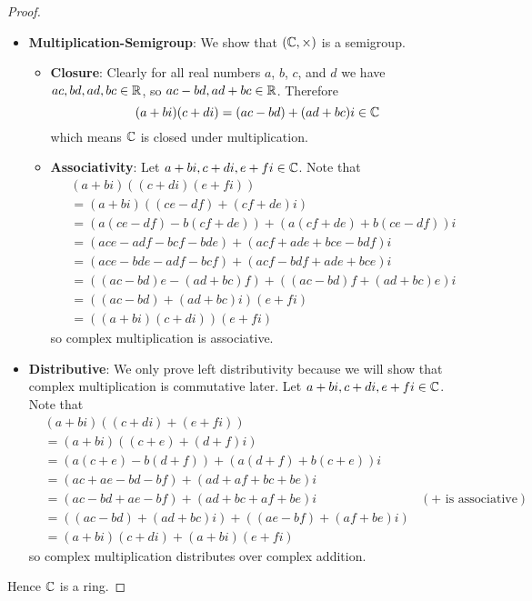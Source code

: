 \begin{proof}
\begin{itemize}
        \item \textbf{Multiplication-Semigroup}: We show that $(\mathbb{C}, \times)$ is a semigroup.
        \begin{itemize}
            \item \textbf{Closure}: Clearly for all real numbers $a$, $b$, $c$, and $d$ we have $ac, bd, ad, bc \in \mathbb{R}$, so $ac - bd, ad + bc \in \mathbb{R}$. Therefore
            \[
                (a+bi)(c+di) = (ac-bd) + (ad+bc)i \in \mathbb{C}
            \]
            which means $\mathbb{C}$ is closed under multiplication.

            \item \textbf{Associativity}: Let $a+bi, c+di, e+fi \in \mathbb{C}$. Note that
            \begin{align*}
                &(a+bi)((c+di)(e+fi))\\
                &= (a+bi)((ce-df)+(cf+de)i)\\
                &= (a(ce-df) - b(cf+de)) + (a(cf+de) + b(ce-df))i\\
                &= (ace - adf - bcf - bde) + (acf + ade + bce - bdf)i\\
                &= (ace - bde - adf - bcf) + (acf - bdf + ade + bce)i\\
                &= ((ac-bd)e - (ad+bc)f) + ((ac-bd)f + (ad+bc)e)i\\
                &= ((ac-bd)+(ad+bc)i)(e+fi)\\
                &= ((a+bi)(c+di))(e+fi)
            \end{align*}
            so complex multiplication is associative.
        \end{itemize}

        \item \textbf{Distributive}: We only prove left distributivity because we will show that complex multiplication is commutative later. Let $a+bi, c+di, e+fi \in \mathbb{C}$. Note that
        \begin{align*}
            &(a+bi)((c+di) + (e+fi))\\
            &= (a+bi)((c+e) + (d+f)i)\\
            &= (a(c+e)-b(d+f)) + (a(d+f) + b(c+e))i\\
            &= (ac+ae-bd-bf) + (ad+af+bc+be)i\\
            &= (ac-bd+ae-bf) + (ad+bc+af+be)i & (+ \text{ is associative})\\
            &= ((ac-bd) + (ad+bc)i) + ((ae - bf) + (af + be)i)\\
            &= (a+bi)(c+di) + (a+bi)(e+fi)
        \end{align*}
        so complex multiplication distributes over complex addition.
    \end{itemize}
    Hence $\mathbb{C}$ is a ring.


\end{proof}
